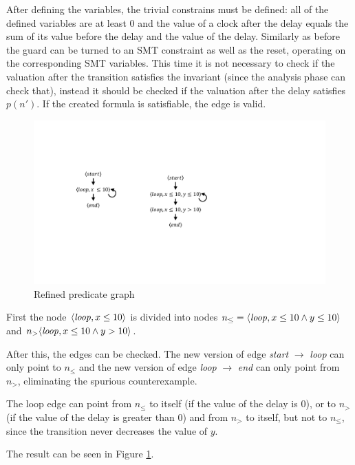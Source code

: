 \begin{runningExample}
After defining the variables, the trivial constrains must be defined: all of the defined variables are at least 0 and the value of a clock after the delay equals the sum of its value before the delay and the value of the delay. Similarly as before the guard can be turned to an SMT constraint as well as the reset, operating on the corresponding SMT variables. This time it is not necessary to check if the valuation after the transition satisfies the invariant (since the analysis phase can check that), instead it should be checked if the valuation after the delay satisfies $p(n')$. If the created formula is satisfiable, the edge is valid.

\begin{figure} 
	\centering
	\includegraphics[width=.7\textwidth]{include/figures/runex_pred_ref}
	\caption{Refined predicate graph}
	\label{fig:predref}
\end{figure}

\begin{runningExample}
	First the node $ \langle \text{\emph{loop}}, x \leq 10 \rangle$ is divided into nodes $ n_\leq = \langle \text{\emph{loop}}, x \leq 10 \wedge y \leq 10 \rangle$ and $n_> \langle \text{\emph{loop}}, x \leq 10 \wedge y>10 \rangle$.
	
	After this, the edges can be checked. The new version of edge \emph{start} $\to$ \emph{loop} can only point to $n_\leq$ and the new version of edge \emph{loop} $\to$ \emph{end} can only point from $n_>$, eliminating the spurious counterexample.
	
	The loop edge can point from $n_\leq$ to itself (if the value of the delay is 0), or to $n_>$ (if the value of the delay is greater than 0) and from $n_>$ to itself, but not to $n_\leq$, since the transition never decreases the value of $y$.
	
	The result can be seen in Figure \ref{fig:predref}.
	
\end{runningExample}


\end{runningExample}
